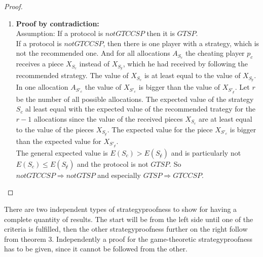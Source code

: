\begin{proof}
\begin{enumerate}
\item \textbf{Proof by contradiction:}\\
\newline
Assumption: If a protocol is $notGTCCSP$ then it is $GTSP$.\\
If a protocol is $notGTCCSP$, then there is one player with a strategy, which is not the recommended one. And for all allocations $A_{S_c}$ the cheating player $p_c$ receives a piece $X_{S_c}$ instead of $X_{S_{\not c}}$, which he had received by following the recommended strategy. The value of $X_{S_c}$ is at least equal to the value of $X_{S_{\not c}}$. In one allocation $A_{S'_c}$ the value of $X_{S'_c}$ is bigger than the value of $X_{S'_{\not c}}$. Let $r$ be the number of all possible allocations. The expected value of the strategy ${S_c}$ al least equal with the expected value of the recommended trategy for the $r-1$ allocations since the value of the received pieces $X_{S_c}$ are at least equal to the value of the pieces $X_{S_{\not c}}$. The expected value for the piece $X_{S'_c}$ is bigger than the expected value for $X_{S'_{\not c}}$. \\
The general expected value is $E(S_c)> E(S_{\not c})$ and is particularly not $E(S_c)\leq E(S_{\not c})$ and the protocol is not $GTSP$. \blitza 
\newline
\newline
So $notGTCCSP \Rightarrow notGTSP$ and especially $GTSP \Rightarrow GTCCSP$.
\end{enumerate}
\end{proof}
There are two independent types of strategyproofness to show for having a complete quantity of results. The start will be from the left side until one of the criteria is fulfilled, then the other strategyproofness further on the right follow from theorem 3. Independently a proof for the game-theoretic strategyproofness has to be given, since it cannot be followed from the other.  
